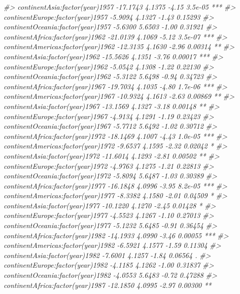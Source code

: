 \documentclass[
]{book}
\newenvironment{Shaded}{\begin{snugshade}}{\end{snugshade}}
\newcommand{\CommentTok}[1]{\textcolor[rgb]{0.56,0.35,0.01}{\textit{#1}}}
\begin{document}
\begin{Shaded}
\begin{Highlighting}[]
\CommentTok{#> continentAsia:factor(year)1957     -17.1743     4.1375   -4.15  3.5e-05 ***}
\CommentTok{#> continentEurope:factor(year)1957    -5.9094     4.1327   -1.43  0.15293    }
\CommentTok{#> continentOceania:factor(year)1957   -5.6300     5.6503   -1.00  0.31921    }
\CommentTok{#> continentAfrica:factor(year)1962   -21.0139     4.1069   -5.12  3.5e-07 ***}
\CommentTok{#> continentAmericas:factor(year)1962 -12.3135     4.1630   -2.96  0.00314 ** }
\CommentTok{#> continentAsia:factor(year)1962     -15.5626     4.1351   -3.76  0.00017 ***}
\CommentTok{#> continentEurope:factor(year)1962    -5.0542     4.1308   -1.22  0.22130    }
\CommentTok{#> continentOceania:factor(year)1962   -5.3122     5.6498   -0.94  0.34723    }
\CommentTok{#> continentAfrica:factor(year)1967   -19.7034     4.1035   -4.80  1.7e-06 ***}
\CommentTok{#> continentAmericas:factor(year)1967 -10.9324     4.1613   -2.63  0.00869 ** }
\CommentTok{#> continentAsia:factor(year)1967     -13.1569     4.1327   -3.18  0.00148 ** }
\CommentTok{#> continentEurope:factor(year)1967    -4.9134     4.1291   -1.19  0.23423    }
\CommentTok{#> continentOceania:factor(year)1967   -5.7712     5.6492   -1.02  0.30712    }
\CommentTok{#> continentAfrica:factor(year)1972   -18.1469     4.1007   -4.43  1.0e-05 ***}
\CommentTok{#> continentAmericas:factor(year)1972  -9.6537     4.1595   -2.32  0.02042 *  }
\CommentTok{#> continentAsia:factor(year)1972     -11.6014     4.1293   -2.81  0.00502 ** }
\CommentTok{#> continentEurope:factor(year)1972    -4.9763     4.1275   -1.21  0.22813    }
\CommentTok{#> continentOceania:factor(year)1972   -5.8094     5.6487   -1.03  0.30389    }
\CommentTok{#> continentAfrica:factor(year)1977   -16.1848     4.0996   -3.95  8.2e-05 ***}
\CommentTok{#> continentAmericas:factor(year)1977  -8.3382     4.1580   -2.01  0.04509 *  }
\CommentTok{#> continentAsia:factor(year)1977     -10.1220     4.1270   -2.45  0.01428 *  }
\CommentTok{#> continentEurope:factor(year)1977    -4.5523     4.1267   -1.10  0.27013    }
\CommentTok{#> continentOceania:factor(year)1977   -5.1232     5.6485   -0.91  0.36454    }
\CommentTok{#> continentAfrica:factor(year)1982   -14.1933     4.0990   -3.46  0.00055 ***}
\CommentTok{#> continentAmericas:factor(year)1982  -6.5921     4.1577   -1.59  0.11304    }
\CommentTok{#> continentAsia:factor(year)1982      -7.6001     4.1257   -1.84  0.06564 .  }
\CommentTok{#> continentEurope:factor(year)1982    -4.1185     4.1262   -1.00  0.31837    }
\CommentTok{#> continentOceania:factor(year)1982   -4.0553     5.6483   -0.72  0.47288    }
\CommentTok{#> continentAfrica:factor(year)1987   -12.1850     4.0995   -2.97  0.00300 ** }

\end{Highlighting}
\end{Shaded}
\end{document}
